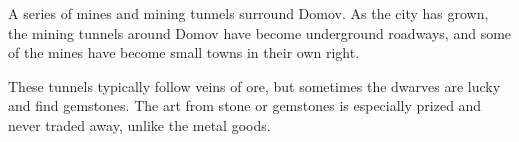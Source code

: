 A series of mines and mining tunnels surround Domov.
As the city has grown, the mining tunnels around Domov have become underground roadways, and some of the mines have become small towns in their own right.

These tunnels typically follow veins of ore, but sometimes the dwarves are lucky and find gemstones.
The art from stone or gemstones is especially prized and never traded away, unlike the metal goods.
